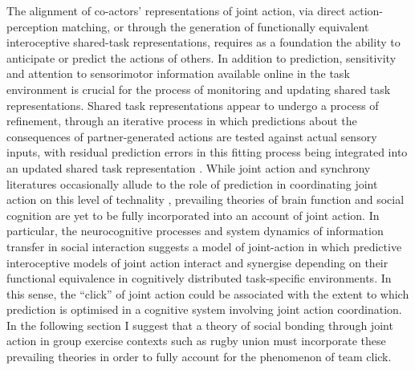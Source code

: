 The alignment of co-actors' representations of joint action, via direct action-perception matching, or through the generation of functionally equivalent interoceptive shared-task representations, requires as a foundation the ability to anticipate or predict the actions of others.  In addition to prediction, sensitivity and attention to sensorimotor information available online in the task environment is crucial for the process of monitoring and updating shared task representations. Shared task representations appear to undergo a process of refinement, through an iterative process in which predictions about the consequences of partner-generated actions are tested against actual sensory inputs, with residual prediction errors in this fitting process being integrated into an updated shared task representation \citep{Vesper2016}. While joint action and synchrony literatures occasionally allude to the role of prediction in coordinating joint action on this level of technality \citep[see for example][]{Sebanz2009,Glover2017}, prevailing theories of brain function and social cognition are yet to be fully incorporated into an account of joint action.  In particular, the neurocognitive processes and system dynamics of information transfer in social interaction suggests a model of joint-action in which predictive interoceptive models of joint action interact and synergise depending on their functional equivalence in cognitively distributed task-specific environments. In this sense, the ``click'' of joint action could be associated with the extent to which prediction is optimised in a cognitive system involving joint action coordination.  In the following section I suggest that a theory of social bonding through joint action in group exercise contexts such as rugby union must incorporate these prevailing theories in order to fully account for the phenomenon of team click.

\clearpage


